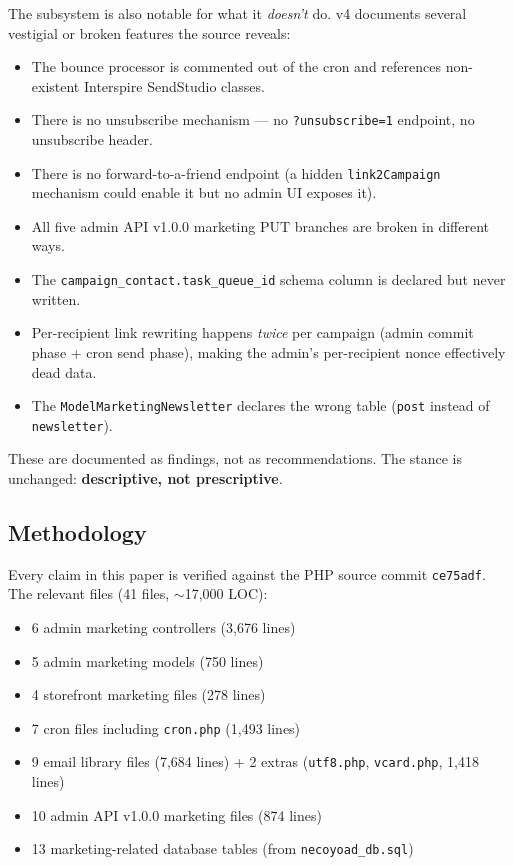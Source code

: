 \documentclass[11pt,a4paper]{article}
\begin{document}
The subsystem is also notable for what it \emph{doesn't} do. v4
documents several vestigial or broken features the source reveals:

\begin{itemize}[leftmargin=1.6em,itemsep=2pt]
  \item The bounce processor is commented out of the cron and
        references non-existent Interspire SendStudio classes.
  \item There is no unsubscribe mechanism --- no
        \texttt{?unsubscribe=1} endpoint, no unsubscribe header.
  \item There is no forward-to-a-friend endpoint (a hidden
        \texttt{link2Campaign} mechanism could enable it but no
        admin UI exposes it).
  \item All five admin API v1.0.0 marketing PUT branches are broken
        in different ways.
  \item The \texttt{campaign\_contact.task\_queue\_id} schema column
        is declared but never written.
  \item Per-recipient link rewriting happens \emph{twice} per
        campaign (admin commit phase + cron send phase), making the
        admin's per-recipient nonce effectively dead data.
  \item The \texttt{ModelMarketingNewsletter} declares the wrong
        table (\texttt{post} instead of \texttt{newsletter}).
\end{itemize}

These are documented as findings, not as recommendations. The stance
is unchanged: \textbf{descriptive, not prescriptive}.

\subsection{Methodology}

Every claim in this paper is verified against the PHP source commit
\texttt{ce75adf}. The relevant files (41 files, $\sim$17{,}000 LOC):

\begin{itemize}[leftmargin=1.6em,itemsep=2pt]
  \item 6 admin marketing controllers (3,676 lines)
  \item 5 admin marketing models (750 lines)
  \item 4 storefront marketing files (278 lines)
  \item 7 cron files including \texttt{cron.php} (1,493 lines)
  \item 9 email library files (7,684 lines) + 2 extras (\texttt{utf8.php},
        \texttt{vcard.php}, 1,418 lines)
  \item 10 admin API v1.0.0 marketing files (874 lines)
  \item 13 marketing-related database tables (from \texttt{necoyoad\_db.sql})
\end{itemize}
\end{document}
